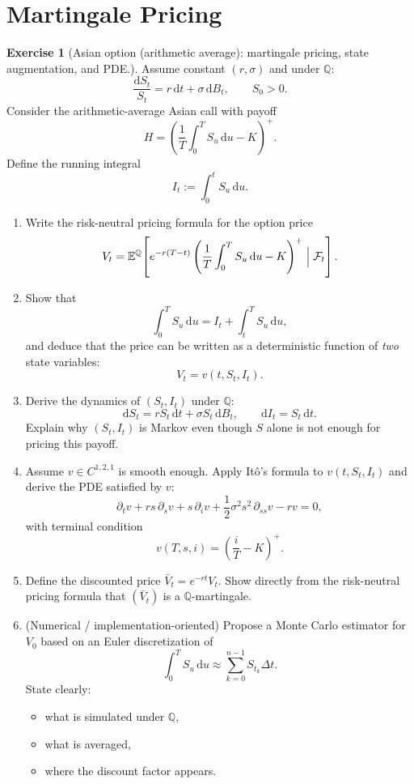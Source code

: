 \documentclass[11pt]{article}
\newcommand{\E}{\mathbb{E}}
\newcommand{\F}{\mathcal{F}}
\theoremstyle{plain}
\theoremstyle{definition}
\newtheorem{exercise}[theorem]{Exercise}
\theoremstyle{remark}
\begin{document}
\section{Martingale Pricing}

\begin{exercise}[Asian option (arithmetic average): martingale pricing, state augmentation, and PDE.]
Assume constant $(r,\sigma)$ and under $\mathbb{Q}$:
\[
\frac{\mathrm{d}S_t}{S_t}=r\,\mathrm{d}t+\sigma\,\mathrm{d}B_t,
\qquad S_0>0.
\]
Consider the arithmetic-average Asian call with payoff
\[
H=\left(\frac1T\int_0^T S_u\,\mathrm{d}u-K\right)^+.
\]
Define the running integral
\[
I_t:=\int_0^t S_u\,\mathrm{d}u.
\]

\begin{enumerate}[leftmargin=1.2em, label=(\alph*), itemsep=0.3em]
\item Write the risk-neutral pricing formula for the option price
\[
V_t=\E^\mathbb{Q}\!\left[e^{-r(T-t)}\left(\frac1T\int_0^T S_u\,\mathrm{d}u-K\right)^+\Bigm|\F_t\right].
\]

\item Show that
\[
\int_0^T S_u\,\mathrm{d}u=I_t+\int_t^T S_u\,\mathrm{d}u,
\]
and deduce that the price can be written as a deterministic function of \emph{two} state variables:
\[
V_t=v(t,S_t,I_t).
\]

\item Derive the dynamics of $(S_t,I_t)$ under $\mathbb{Q}$:
\[
\mathrm{d}S_t=rS_t\,\mathrm{d}t+\sigma S_t\,\mathrm{d}B_t,
\qquad
\mathrm{d}I_t=S_t\,\mathrm{d}t.
\]
Explain why $(S_t,I_t)$ is Markov even though $S$ alone is not enough for pricing this payoff.

\item Assume $v\in C^{1,2,1}$ is smooth enough. Apply It\^o's formula to $v(t,S_t,I_t)$ and derive the PDE satisfied by $v$:
\[
\partial_t v + rs\,\partial_s v + s\,\partial_i v + \frac12\sigma^2 s^2\,\partial_{ss}v - rv=0,
\]
with terminal condition
\[
v(T,s,i)=\left(\frac{i}{T}-K\right)^+.
\]

\item Define the discounted price $\bar V_t=e^{-rt}V_t$. Show directly from the risk-neutral pricing formula that $(\bar V_t)$ is a $\mathbb{Q}$-martingale.

\item (Numerical / implementation-oriented) Propose a Monte Carlo estimator for $V_0$ based on an Euler discretization of
\[
\int_0^T S_u\,\mathrm{d}u
\approx \sum_{k=0}^{n-1} S_{t_k}\Delta t.
\]
State clearly:
\begin{itemize}[leftmargin=1.2em]
\item what is simulated under $\mathbb{Q}$,
\item what is averaged,
\item where the discount factor appears.
\end{itemize}


\end{enumerate}
\end{exercise}
\end{document}

